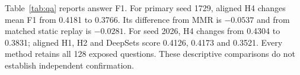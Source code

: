 Table~\ref{tab:qa} reports answer F1. For primary seed 1729, aligned H4 changes mean F1 from 0.4181 to 0.3766. Its difference from MMR is $-0.0537$ and from matched static replay is $-0.0281$. For seed 2026, H4 changes from 0.4304 to 0.3831; aligned H1, H2 and DeepSets score 0.4126, 0.4173 and 0.3521. Every method retains all 128 exposed questions. These descriptive comparisons do not establish independent confirmation.
